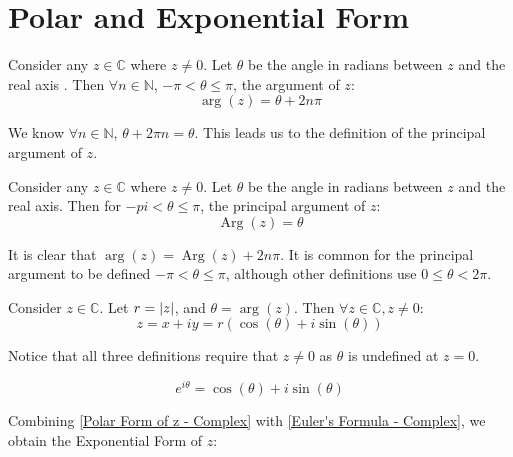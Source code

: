 \documentclass[12pt, english]{book}
\DeclareMathOperator\Arg{Arg}
\begin{document}
	\section{Polar and Exponential Form} \label{Polar and Exponential Form Section - Complex}
	
	\begin{definition}
		Consider any $z \in \mathbb{C}$ where $z \neq 0$.
		Let $\theta$ be the angle in radians between $z$ and the real axis .
		Then $\forall n \in \mathbb{N}$, $-\pi < \theta \leq \pi$, the argument of $z$:
		$$ \arg(z) = \theta + 2 n \pi$$
		\label{Argument - Complex}
	\end{definition}
	
	We know $\forall n \in \mathbb{N}$, $\theta + 2 \pi n = \theta$. This leads us to the definition of the principal argument of $z$.
	\begin{definition}
		Consider any $z \in \mathbb{C}$ where $z \neq 0$.
		Let $\theta$ be the angle in radians between $z$ and the real axis.
		Then for $-pi < \theta \leq \pi$, the principal argument of $z$:
		$$\Arg(z) = \theta$$
		\label{Principal Argument - Complex}
	\end{definition}
	It is clear that $\arg(z) = \Arg(z) + 2n \pi$. It is common for the principal argument to be defined $-\pi < \theta \leq \pi$, although other definitions use $0 \leq \theta < 2\pi$.
	
	\begin{definition}
		Consider $z \in \mathbb{C}$. Let $r = \abs{z}$, and $\theta = \arg(z)$. 
		Then $\forall z \in \mathbb{C}, z \neq 0$:
		$$z = x + iy = r(\cos(\theta) + i \sin(\theta))$$
		\label{Polar Form of z - Complex}
	\end{definition}

	Notice that all three definitions require that $z \neq 0$ as $\theta$ is undefined at $z = 0$.
	
	\begin{theorem}
		$$e^{i \theta} = \cos(\theta) + i \sin(\theta)$$
		\label{Euler's Formula - Complex}
	\end{theorem}
	Combining \cref{Polar Form of z - Complex} with \cref{Euler's Formula - Complex}, we obtain the Exponential Form of $z$: 
	
\end{document}
